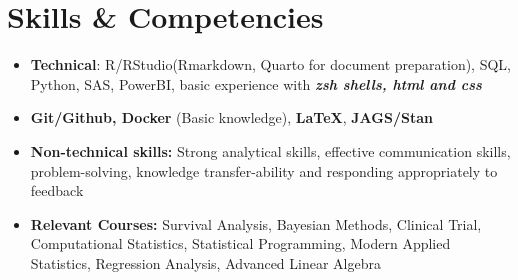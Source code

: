 \documentclass[letterpaper,11pt]{article}
\newcommand{\resumeSubHeadingListStart}{\begin{itemize}[leftmargin=0pt]}
\newcommand{\resumeSubHeadingListEnd}{\end{itemize}}
\begin{document}
\section{Skills \& Competencies}
\resumeSubHeadingListStart
\item{
	\textbf{Technical}{: R/RStudio(Rmarkdown, Quarto for document preparation), SQL, Python, SAS, PowerBI, basic experience with \textbf{\textit{zsh shells, html and css}}}\vspace{-8pt}
}
\item{\textbf{Git/Github, Docker} (Basic knowledge), \textbf{\LaTeX}}, \textbf{JAGS/Stan}\vspace{-8pt}
\item{
	\textbf{Non-technical skills:} {Strong analytical skills, effective communication skills, problem-solving, knowledge transfer-ability and responding appropriately to feedback}
}\vspace{-8pt}
\item{\textbf{Relevant Courses:} Survival Analysis, Bayesian Methods, Clinical Trial, Computational Statistics, Statistical Programming, Modern Applied Statistics, Regression Analysis, Advanced Linear Algebra}\vspace{-8pt}
\resumeSubHeadingListEnd
\end{document}
